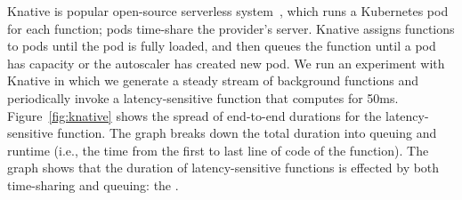 Knative is popular open-source serverless system~\cite{knative}, which
runs a Kubernetes pod for each function; pods time-share the
provider's server. Knative assigns functions to pods until the pod is
fully loaded, and then queues the function until a pod has capacity or
the autoscaler has created new pod.  We run an experiment with Knative
in which we generate a steady stream of background functions and
periodically invoke a latency-sensitive function that computes for
50ms. Figure~\ref{fig:knative} shows the spread of end-to-end
durations for the latency-sensitive function.  The graph breaks down
the total duration into queuing and runtime (i.e., the time from the
first to last line of code of the function).  The graph shows that the
duration of latency-sensitive functions is effected by both
time-sharing and queuing: the \problem{}.






